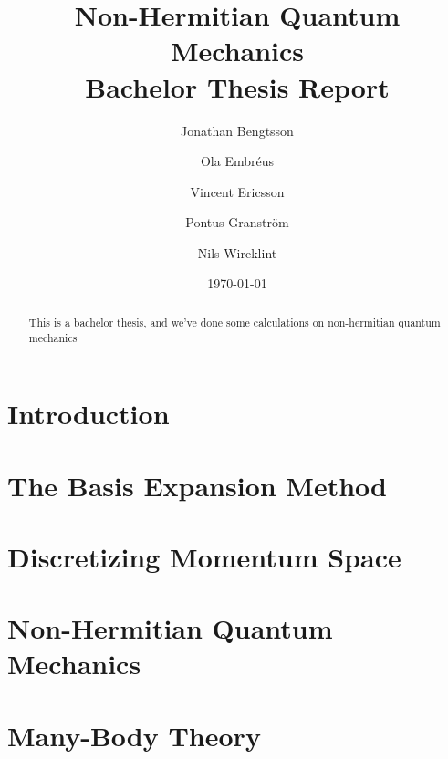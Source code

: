 \documentclass[12pt,a4paper]{report}
\begin{document}
  


\title{Non-Hermitian Quantum Mechanics\\
\Large Bachelor Thesis Report}
\author{Jonathan Bengtsson  \and Ola Embréus \and Vincent Ericsson \and Pontus Granström \and Nils Wireklint}
\date{\today}



\maketitle

\newpage
\begin{abstract}
This is a bachelor thesis, and we've done some calculations on non-hermitian quantum mechanics 
\end{abstract}
\newpage

\tableofcontents

\newpage

\chapter{Introduction}
\label{cha:introduktion}



\chapter{The Basis Expansion Method} %
\label{cha:the_basis_expansion_method}



\chapter{Discretizing Momentum Space} %
\label{cha:discretizing_momentum_space}

%

\chapter{Non-Hermitian Quantum Mechanics} %
\label{cha:non_hermitian_quantum_mechanics}


\chapter{Many-Body Theory} %
\label{cha:many_body_theory}
\end{document}
